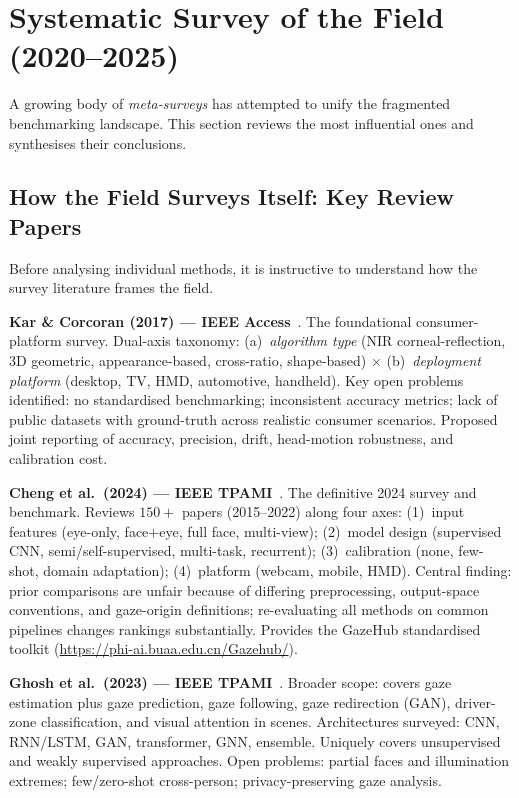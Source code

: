 \documentclass[11pt,a4paper]{article}
\begin{document}
\section{Systematic Survey of the Field (2020--2025)}
\label{sec:surveys}

A growing body of \emph{meta-surveys} has attempted to unify the fragmented benchmarking landscape.
This section reviews the most influential ones and synthesises their conclusions.

\subsection{How the Field Surveys Itself: Key Review Papers}

Before analysing individual methods, it is instructive to understand how the survey
literature frames the field.

\textbf{Kar \& Corcoran (2017) --- IEEE Access}~\cite{kar2017review}.
The foundational consumer-platform survey.
Dual-axis taxonomy: (a)~\emph{algorithm type} (NIR corneal-reflection, 3D geometric, appearance-based,
cross-ratio, shape-based) $\times$ (b)~\emph{deployment platform} (desktop, TV, HMD, automotive, handheld).
Key open problems identified: no standardised benchmarking; inconsistent accuracy metrics;
lack of public datasets with ground-truth across realistic consumer scenarios.
Proposed joint reporting of accuracy, precision, drift, head-motion robustness, and calibration cost.

\textbf{Cheng et al.\ (2024) --- IEEE TPAMI}~\cite{cheng2024survey}.
The definitive 2024 survey and benchmark.
Reviews $150+$ papers (2015--2022) along four axes:
(1)~input features (eye-only, face+eye, full face, multi-view);
(2)~model design (supervised CNN, semi/self-supervised, multi-task, recurrent);
(3)~calibration (none, few-shot, domain adaptation);
(4)~platform (webcam, mobile, HMD).
Central finding: prior comparisons are unfair because of differing preprocessing,
output-space conventions, and gaze-origin definitions;
re-evaluating all methods on common pipelines changes rankings substantially.
Provides the GazeHub standardised toolkit (\url{https://phi-ai.buaa.edu.cn/Gazehub/}).

\textbf{Ghosh et al.\ (2023) --- IEEE TPAMI}~\cite{ghosh2023gazesurvey}.
Broader scope: covers gaze estimation plus gaze prediction, gaze following, gaze redirection (GAN),
driver-zone classification, and visual attention in scenes.
Architectures surveyed: CNN, RNN/LSTM, GAN, transformer, GNN, ensemble.
Uniquely covers unsupervised and weakly supervised approaches.
Open problems: partial faces and illumination extremes; few/zero-shot cross-person;
privacy-preserving gaze analysis.
\end{document}

